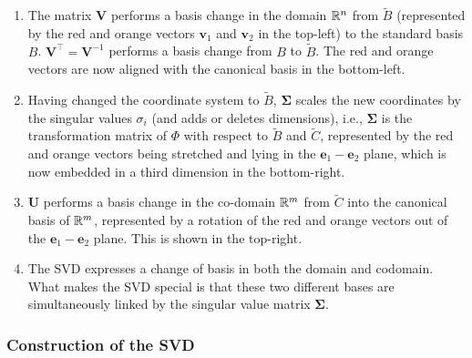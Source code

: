 \begin{enumerate}
    \item The matrix $\bm{V}$ performs a basis change in the domain $\mathbb{R}^n$ from $\tilde{B}$ (represented by the red and orange vectors $\bm{v}_1$ and $\bm{v}_2$ in the top-left) to the standard basis $B$.
    $\bm{V}^\top = \bm{V}^{-1}$ performs a basis change from $B$ to $\tilde{B}$.
    The red and orange vectors are now aligned with the canonical basis in the bottom-left.
    \hfill \cite{mfml/book/mml/Deisenroth-Faisal-Ong}

    \item Having changed the coordinate system to $\tilde{B}$, $\bm{\Sigma}$ scales the new coordinates by the singular values $\sigma _i$ (and adds or deletes dimensions), i.e., $\bm{\Sigma}$  is the transformation matrix of $\Phi$ with respect to $\tilde{B}$ and $\tilde{C}$, represented by the red and orange vectors being stretched and lying in the $\bm{e}_1-\bm{e}_2$ plane, which is now embedded in a third dimension in the bottom-right.
    \hfill \cite{mfml/book/mml/Deisenroth-Faisal-Ong}

    \item $\bm{U}$ performs a basis change in the co-domain $\mathbb{R}^m$ from $\tilde{C}$ into the canonical basis of $\mathbb{R}^m$, represented by a rotation of the red and orange vectors out of the $\bm{e}_1-\bm{e}_2$ plane.
    This is shown in the top-right.
    \hfill \cite{mfml/book/mml/Deisenroth-Faisal-Ong}

    \item The SVD expresses a change of basis in both the domain and codomain.
    What makes the SVD special is that these two different bases are simultaneously linked by the singular value matrix $\bm{\Sigma}$.
    \hfill \cite{mfml/book/mml/Deisenroth-Faisal-Ong}
\end{enumerate}



\subsubsection{Construction of the SVD}

